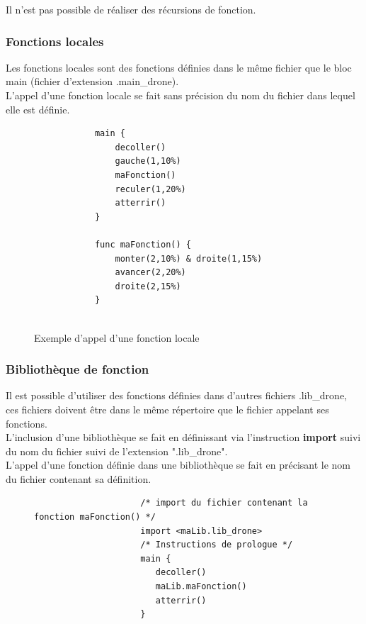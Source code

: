 \documentclass[12pt]{article}
\begin{document}
Il n'est pas possible de réaliser des récursions de fonction. 
	\subsubsection{Fonctions locales}
	
	Les fonctions locales sont des fonctions définies dans le même fichier que le bloc main (fichier d'extension .main\_drone). \\
	L'appel d'une fonction locale se fait sans précision du nom du fichier dans lequel elle est définie.
	
    \begin{figure}[h!]
        \begin{center}
            \begin{verbatim}
            main {
                decoller()
                gauche(1,10%)
                maFonction()
                reculer(1,20%)
                atterrir()
            }
                
            func maFonction() {
                monter(2,10%) & droite(1,15%)
                avancer(2,20%)
                droite(2,15%)
            }
            
            \end{verbatim}
        \end{center}
        \caption{Exemple d'appel d'une fonction locale}
        \label{Exemple d'appel d'une fonction locale}
    \end{figure}

	
	\subsubsection{Bibliothèque de fonction}

	Il est possible d'utiliser des fonctions définies dans d'autres fichiers .lib\_drone, ces fichiers doivent être dans le même répertoire que le fichier appelant ses fonctions.\\
	L'inclusion d'une bibliothèque se fait en définissant via l'instruction \textbf{import} suivi du nom du fichier suivi de l'extension ".lib\_drone".\\
	L'appel d'une fonction définie dans une bibliothèque se fait en précisant le nom du fichier contenant sa définition.\\
	
	  \begin{figure}[h!]
       		 \begin{center}
        		    \begin{verbatim}
		             /* import du fichier contenant la fonction maFonction() */
		             import <maLib.lib_drone>	
		             /* Instructions de prologue */
		             main {
		                decoller()
		                maLib.maFonction()
		                atterrir()
		             }
        		    \end{verbatim}
        		\end{center}
   	 \end{figure}
	
\end{document}
